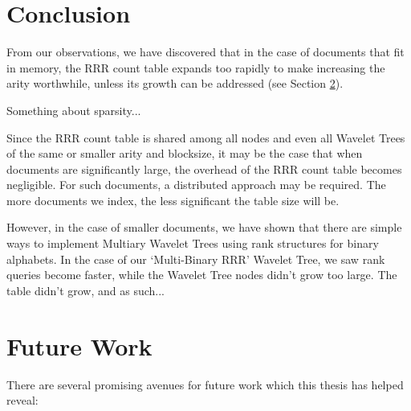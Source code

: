 \section{Conclusion}
\label{sec:conclusion}

From our observations, we have discovered that in the case of documents that fit 
in memory, the RRR count table expands too rapidly to make increasing the arity 
worthwhile, unless its growth can be addressed (see Section \ref{sec:future}).

Something about sparsity...

Since the RRR count table is shared among all nodes and even all Wavelet Trees
of the same or smaller arity and blocksize, it may be the case that when 
documents are significantly large, the overhead of the RRR count table becomes 
negligible. For such documents, a distributed approach may be required. The more 
documents we index, the less significant the table size will be.

However, in the case of smaller documents, we have shown that there are simple 
ways to implement Multiary Wavelet Trees using rank structures for binary 
alphabets. In the case of our `Multi-Binary RRR' Wavelet Tree, we saw rank 
queries become faster, while the Wavelet Tree nodes didn't grow too large. The 
table didn't grow, and as such...

\section{Future Work}
\label{sec:future}
There are several promising avenues for future work which this thesis has helped
reveal:

